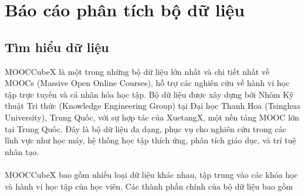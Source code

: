 \section{Báo cáo phân tích bộ dữ liệu}
\subsection{Tìm hiểu dữ liệu}
MOOCCubeX là một trong những bộ dữ liệu lớn nhất và chi tiết nhất về MOOCs (Massive Open Online Courses), hỗ trợ các nghiên cứu về hành vi học tập trực tuyến và cá nhân hóa học tập. Bộ dữ liệu được xây dựng bởi Nhóm Kỹ thuật Tri thức (Knowledge Engineering Group) tại Đại học Thanh Hoa (Tsinghua University), Trung Quốc, với sự hợp tác của XuetangX, một nền tảng MOOC lớn tại Trung Quốc. Đây là bộ dữ liệu đa dạng, phục vụ cho nghiên cứu trong các lĩnh vực như học máy, hệ thống học tập thích ứng, phân tích giáo dục, và trí tuệ nhân tạo.\\
\\
MOOCCubeX bao gồm nhiều loại dữ liệu khác nhau, tập trung vào các khóa học và hành vi học tập của học viên. Các thành phần chính của bộ dữ liệu bao gồm\\
